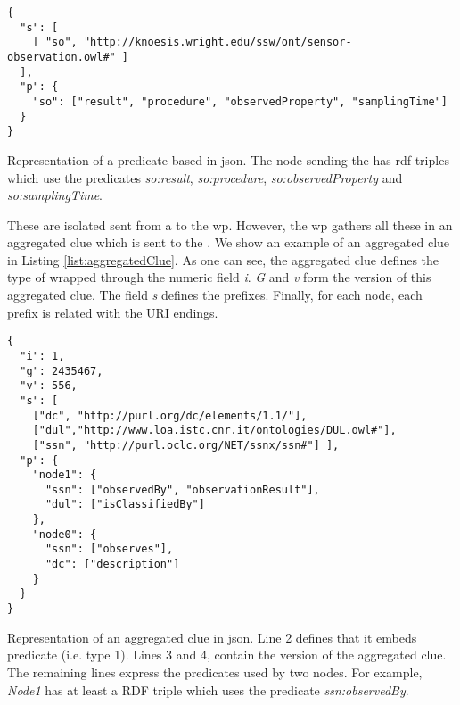 \begin{listing}
  \begin{verbatim}
{
  "s": [
    [ "so", "http://knoesis.wright.edu/ssw/ont/sensor-observation.owl#" ]
  ],
  "p": {
    "so": ["result", "procedure", "observedProperty", "samplingTime"]
  }
}
  \end{verbatim}
  \caption{
    Representation of a predicate-based \clue{} in \acs{json}.
    The node sending the \clue{} has \acs{rdf} triples which use the predicates
    \emph{so:result}, \emph{so:procedure}, \emph{so:observedProperty} and \emph{so:samplingTime}.
  }
  \label{list:oneClue}
\end{listing}

\medskip

These are isolated \clues{} sent from a \provider{} to the \ac{wp}.
However, the \ac{wp} gathers all these \clues{} in an aggregated clue which is sent to the \consumer{}.
We show an example of an aggregated clue in Listing \ref{list:aggregatedClue}.
As one can see, the aggregated clue defines the type of \clues{} wrapped through the numeric field \emph{i}.
\emph{G} and \emph{v} form the version of this aggregated clue.
The field \emph{s} defines the prefixes.
Finally, for each node, each prefix is related with the URI endings.

\begin{listing}
  \begin{verbatim}
{
  "i": 1,
  "g": 2435467,
  "v": 556,
  "s": [
    ["dc", "http://purl.org/dc/elements/1.1/"],
    ["dul","http://www.loa.istc.cnr.it/ontologies/DUL.owl#"],
    ["ssn", "http://purl.oclc.org/NET/ssnx/ssn#"] ],
  "p": {
    "node1": {
      "ssn": ["observedBy", "observationResult"],
      "dul": ["isClassifiedBy"]
    },
    "node0": {
      "ssn": ["observes"],
      "dc": ["description"]
    }
  }
}
  \end{verbatim}
  \caption{
    Representation of an aggregated clue in \ac{json}.
    Line 2 defines that it embeds predicate \clues{} (i.e. type 1).
    Lines 3 and 4, contain the version of the aggregated clue.
    The remaining lines express the predicates used by two nodes.
    For example, \emph{Node1} has at least a RDF triple which uses the predicate \emph{ssn:observedBy}.
  }
  \label{list:aggregatedClue}
\end{listing}

